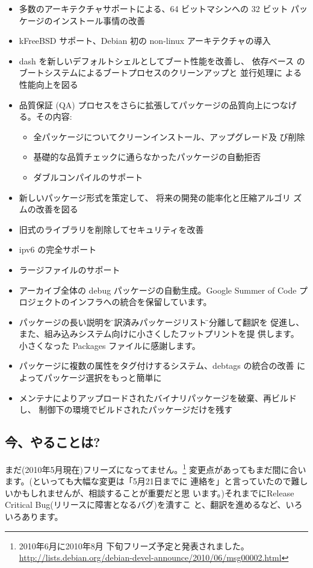 \documentclass[mingoth,a4paper]{jsarticle}
\begin{document}
\begin{itemize}
 \item 多数のアーキテクチャサポートによる、64 ビットマシンへの 32 ビット
       パッケージのインストール事情の改善
 \item kFreeBSD サポート、Debian 初の non-linux アーキテクチャの導入
 \item dash を新しいデフォルトシェルとしてブート性能を改善し、 依存ベース
       のブートシステムによるブートプロセスのクリーンアップと 並行処理に
       よる性能向上を図る
 \item 品質保証 (QA) プロセスをさらに拡張してパッケージの品質向上につなげ
       る。その内容:
        \begin{itemize}
         \item 全パッケージについてクリーンインストール、アップグレード及
               び削除
         \item 基礎的な品質チェックに通らなかったパッケージの自動拒否
         \item ダブルコンパイルのサポート
        \end{itemize}
 \item 新しいパッケージ形式を策定して、 将来の開発の能率化と圧縮アルゴリ
       ズムの改善を図る
 \item 旧式のライブラリを削除してセキュリティを改善
 \item ipv6 の完全サポート
 \item ラージファイルのサポート
 \item アーカイブ全体の debug パッケージの自動生成。Google Summer of
       Code プロジェクトのインフラへの統合を保留しています。
 \item パッケージの長い説明を\"翻訳済みパッケージリスト\"に分離して翻訳を
       促進し、 また、組み込みシステム向けに小さくしたフットプリントを提
       供します。 小さくなった Packages ファイルに感謝します。
 \item パッケージに複数の属性をタグ付けするシステム、debtags の統合の改善
       によってパッケージ選択をもっと簡単に
 \item メンテナによりアップロードされたバイナリパッケージを破棄、再ビルド
       し、 制御下の環境でビルドされたパッケージだけを残す
\end{itemize}

\subsection{今、やることは?}

まだ(2010年5月現在)フリーズになってません。\footnote{2010年6月に2010年8月
下旬フリーズ予定と発表されました。
\url{http://lists.debian.org/debian-devel-announce/2010/06/msg00002.html}}
変更点があってもまだ間に合います。(といっても大幅な変更は「5月21日までに
連絡を」と言っていたので難しいかもしれませんが、相談することが重要だと思
います。)それまでにRelease Critical Bug(リリースに障害となるバグ)を潰すこ
と、翻訳を進めるなど、いろいろあります。
\end{document}
